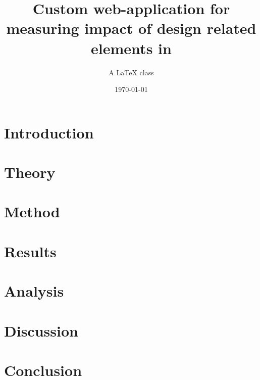 \documentclass[nofilelist]{cslthse-msc}
\title{Custom web-application for measuring impact of design related elements in}
\subtitle{A {\LaTeX} class}
\date{\today}
\begin{document}
\renewcommand{\bibname}{References}

\makefrontmatter

\chapter{Introduction}
\chapter{Theory}
\chapter{Method}
\chapter{Results}
\chapter{Analysis}
\chapter{Discussion}
\chapter{Conclusion}

{}

\checkoddpage
\ifoddpage
\else
   \newpage
   \thispagestyle{empty}
   \mbox{ }
\fi
\begin{appendices}
%
\end{appendices}
\end{document}
